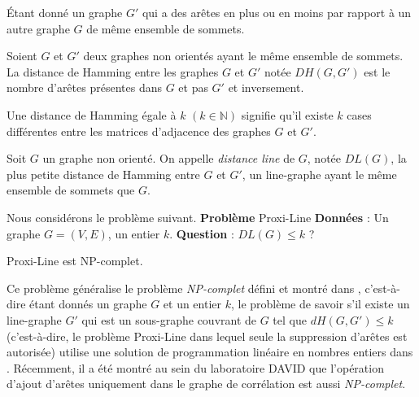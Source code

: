 \'Etant donn\'e un graphe $G'$ qui a des ar\^etes en plus ou en moins par rapport \`a un autre graphe $G$ de m\^eme ensemble de sommets.
\begin{definition}
Soient $G$ et $G'$ deux  graphes non orient\'es ayant le m\^eme ensemble de sommets.
\newline
La distance de Hamming entre les graphes $G$ et $G'$ not\'ee $DH(G,G')$ est le nombre d'ar\^etes pr\'esentes dans $G$ et pas $G'$ et inversement.
\end{definition}
Une distance de Hamming \'egale \`a $k$ $(k \in \mathbb{N})$ signifie qu'il existe $k$ cases diff\'erentes entre les matrices d'adjacence des graphes $G$ et $G'$.


\begin{definition}
Soit $G$ un graphe non orient\'e.
\newline
On appelle {\em distance line} de $G$, not\'ee $DL(G)$, la plus petite distance de Hamming entre $G$ et $G'$, un line-graphe ayant le m\^eme ensemble de sommets que $G$.
\end{definition}


Nous consid\'erons le probl\`eme suivant. \newline
{\bf Probl\`eme} Proxi-Line \newline
{\bf Donn\'ees} : Un graphe $G=(V,E)$, un entier $k$. \newline
{\bf Question} : $DL(G) \le k$ ? 
\newline


\begin{conjecture}
Proxi-Line est NP-complet.
\end{conjecture}

Ce probl\`eme g\'en\'eralise le probl\`eme {\em NP-complet} d\'efini et montr\'e  dans \cite{yannakakis1978node}, c'est-\`a-dire \'etant donn\'es un graphe $ G $ et un entier $k$, le probl\`eme de savoir s'il existe un line-graphe $ G'$ qui est un sous-graphe couvrant de $ G $ tel que $ dH (G, G' ) \leq k $ (c'est-\`a-dire, le probl\`eme Proxi-Line dans lequel seule la suppression d'ar\^etes  est autoris\'ee) utilise une solution de programmation lin\'eaire en nombres entiers   dans \cite{Halldorsson2013}. R\'ecemment, il a \'et\'e montr\'e au sein du laboratoire DAVID que l'op\'eration d'ajout d'ar\^etes uniquement dans le graphe de corr\'elation est aussi  {\em NP-complet}.
